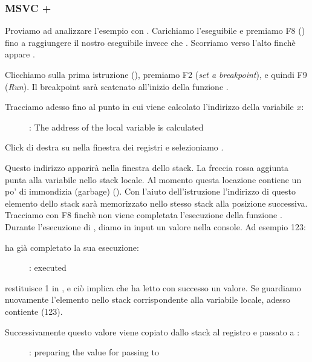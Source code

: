 \clearpage
\subsubsection{MSVC + \olly}
\myindex{\olly}

Proviamo ad analizzare l'esempio con \olly.
Carichiamo l'eseguibile e premiamo F8 (\stepover) fino a raggiungere il nostro eseguibile invece che .
Scorriamo verso l'alto finchè appare \main .

Clicchiamo sulla prima istruzione (), premiamo F2 (\emph{set a breakpoint}), e quindi F9 (\emph{Run}).
Il breakpoint sarà scatenato all'inizio della funzione \main .

Tracciamo adesso fino al punto in cui viene calcolato l'indirizzo della variabile $x$:

\begin{figure}[H]
\centering
{}
\caption{\olly: The address of the local variable is calculated}
\label{fig:scanf_ex1_olly_1}
\end{figure}


Click di destra su \EAX nella finestra dei registri e selezioniamo .

Questo indirizzo apparirà nella finestra dello stack.
La freccia rossa aggiunta punta alla variabile nello stack locale.
Al momento questa locazione contiene un po' di immondizia (garbage) ().
Con l'aiuto dell'istruzione \PUSH l'indirizzo di questo elemento dello stack sarà memorizzato nello stesso stack alla posizione successiva.
Tracciamo con F8 finchè non viene completata l'esecuzione della funzione \scanf.
Durante l'esecuzione di \scanf, diamo in input un valore nella console. Ad esempio 123:



\clearpage
\scanf ha già completato la sua esecuzione:

\begin{figure}[H]
\centering
{}
\caption{\olly: \scanf executed}
\label{fig:scanf_ex1_olly_3}
\end{figure}

\scanf restituisce 1 in \EAX, e ciò implica che ha letto con successo un valore.
Se guardiamo nuovamente l'elemento nello stack corrispondente alla variabile locale, adesso contiente  (123).

\clearpage

Successivamente questo valore viene copiato dallo stack al registro \ECX e passato a \printf:

\begin{figure}[H]
\centering
{}
\caption{\olly: preparing the value for passing to \printf}
\label{fig:scanf_ex1_olly_4}
\end{figure}
